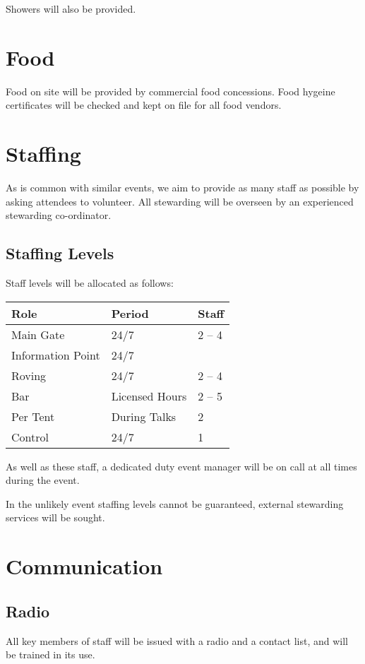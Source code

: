 Showers will also be provided.

\section{Food}

Food on site will be provided by commercial food concessions. Food hygeine certificates will be checked and kept on
file for all food vendors.

\section{Staffing}

As is common with similar events, we aim to provide as many staff as possible
by asking attendees to volunteer. All stewarding will be overseen by an experienced stewarding co-ordinator.

\subsection{Staffing Levels}

Staff levels will be allocated as follows:

\begin{tabular}{l l l}
Role & Period & Staff \\
\hline
Main Gate & 24/7 & 2 -- 4 \\
Information Point & 24/7 & \\
Roving & 24/7 & 2 -- 4 \\
Bar & Licensed Hours & 2 -- 5 \\
Per Tent & During Talks & 2 \\
Control & 24/7 & 1
\end{tabular}

As well as these staff, a dedicated duty event manager will be on call at all times during the event.

In the unlikely event staffing levels cannot be guaranteed, external stewarding services will be sought.

\section{Communication}

\subsection{Radio}
All key members of staff will be issued with a radio and a contact list, and will be trained in its use.

